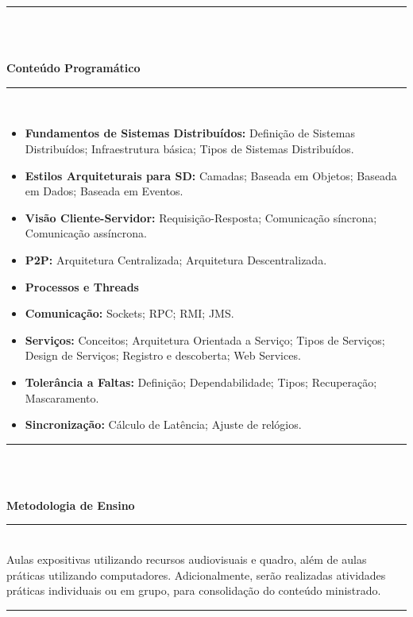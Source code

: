 \noindent\rule{16cm}{0.4pt}\\
\\
\begin{center}\textbf{Conteúdo Programático}\end{center}
\noindent\rule{16cm}{0.4pt}
\\
\begin{itemize}
 \item \textbf{Fundamentos de Sistemas Distribuídos:} Definição de Sistemas Distribuídos; Infraestrutura básica; Tipos de Sistemas Distribuídos.

 \item \textbf{Estilos Arquiteturais para SD:} Camadas; Baseada em Objetos; Baseada em Dados; Baseada em Eventos.

 \item \textbf{Visão Cliente-Servidor:} Requisição-Resposta; Comunicação síncrona; Comunicação assíncrona.

 \item \textbf{P2P:} Arquitetura Centralizada; Arquitetura Descentralizada.
 \item \textbf{Processos e Threads}
 \item \textbf{Comunicação:} Sockets; RPC; RMI; JMS.

 \item \textbf{Serviços:} Conceitos; Arquitetura Orientada a Serviço; Tipos de Serviços; Design de Serviços; Registro e descoberta; Web Services.

 \item \textbf{Tolerância a Faltas:} Definição; Dependabilidade; Tipos; Recuperação; Mascaramento.
 \item \textbf{Sincronização:} Cálculo de Latência; Ajuste de relógios.
\end{itemize}
\noindent\rule{16cm}{0.4pt}\\
\\
\begin{center}\textbf{Metodologia de Ensino}\end{center} 
\noindent\rule{16cm}{0.4pt}
\\
   Aulas expositivas utilizando recursos audiovisuais e quadro, além de aulas práticas utilizando computadores. Adicionalmente, serão realizadas atividades práticas individuais ou em grupo, para consolidação do conteúdo ministrado.\\
\noindent\rule{16cm}{0.4pt}\\
